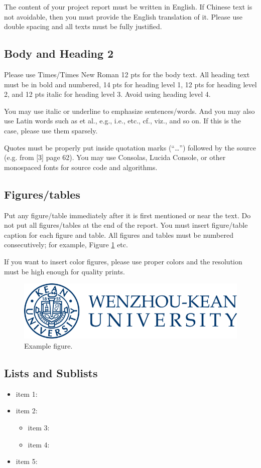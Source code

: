 The content of your project report must be written in English. If Chinese text is not avoidable, then you must provide the English translation of it. Please use double spacing and all texts must be fully justified.

\subsection{Body and Heading 2}
Please use Times/Times New Roman 12 pts for the body text. All heading text must be in bold and numbered, 14 pts for heading level 1, 12 pts for heading level 2, and 12 pts italic for heading level 3. Avoid using heading level 4.


You may use italic or underline to emphasize sentences/words. And you may also use Latin words such as et al., e.g., i.e., etc., cf., viz., and so on. If this is the case, please use them sparsely.


Quotes must be properly put inside quotation marks (“…”) followed by the source (e.g. from [3] page 62). You may use Consolas, Lucida Console, or other monospaced fonts for source code and algorithms.


\subsection{Figures/tables}

Put any figure/table immediately after it is first mentioned or near the text. Do not put all figures/tables at the end of the report. You must insert figure/table caption for each figure and table. All figures and tables must be numbered consecutively; for example, Figure \ref{fig:wku} etc. 


If you want to insert color figures, please use proper colors and the resolution must be high enough for quality prints. 

\begin{figure}
    \centering
    \includegraphics[scale=0.5]{images/wku.png}
    \caption{Example figure.}
    \label{fig:wku}
\end{figure}


\subsection{Lists and Sublists}

\begin{itemize}
    \item item 1: \lipsum[1-1]
    \item item 2: \lipsum[2-2]
    \begin{itemize}
        \item item 3: \lipsum[3-3]
        \item item 4: \lipsum[4-4]
    \end{itemize}
    \item item 5: \lipsum[1-2]
\end{itemize}


\vfill